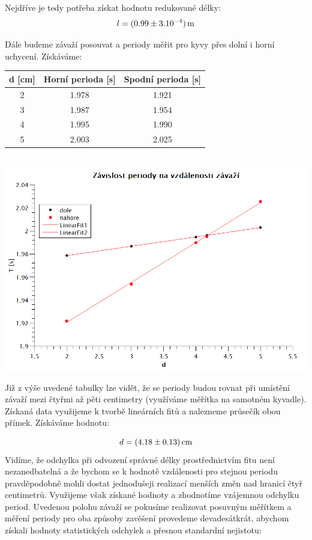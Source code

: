 \documentclass[czech,11pt,a4paper]{article}
\begin{document}
	Nejdříve je tedy potřeba získat hodnotu redukované délky:
	\begin{equation}
		l = (0.99 \pm 3.10^{-4} )\,\rm m
	\end{equation}
	
	Dále budeme závaží posouvat a periody měřit pro kyvy přes dolní i horní uchycení. Získáváme:
	
	\begin{center}
			\begin{tabular}{c|c|c}
		d [cm] & Horní perioda [s] & Spodní perioda [s] \\ \hline
		2      & 1.978   & 1.921    \\ \hline
		3      & 1.987   & 1.954   \\ \hline
		4      & 1.995   & 1.990    \\ \hline
		5      & 2.003   & 2.025    \\
	\end{tabular}\\
	\includegraphics[width=0.75\linewidth]{zavislost}

	\end{center}
	Již z výše uvedené tabulky lze vidět, že se periody budou rovnat při umístění závaží mezi čtyřmi až pěti centimetry (využíváme měřítka na samotném kyvadle). Získaná data využijeme k tvorbě lineárních fitů a nalezneme průsečík obou přímek. Získáváme hodnotu:
	
	\begin{equation}
		d = (4.18 \pm 0.13) \,\rm cm
	\end{equation}
	Vidíme, že odchylka při odvození správné délky prostřednictvím fitu není nezanedbatelná a že bychom se k hodnotě vzdálenosti pro stejnou periodu pravděpodobně mohli dostat jednodušeji realizací menších změn nad hranicí čtyř centimetrů. Využijeme však získané hodnoty a zhodnotíme vzájemnou odchylku period. Uvedenou polohu závaží se pokusíme realizovat posuvným měřítkem a měření periody pro oba způsoby zavěšení provedeme devadesátkrát, abychom získali hodnoty statistických odchylek a přesnou standardní nejistotu:
	
\end{document}
